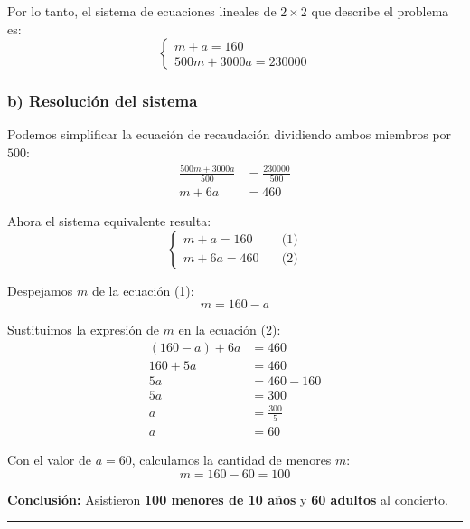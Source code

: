 \documentclass[11pt,a4paper]{article}
\begin{document}
Por lo tanto, el sistema de ecuaciones lineales de $2 \times 2$ que describe el problema es:
\begin{equation*}
\begin{cases}
    m + a = 160 \\
    500m + 3000a = 230000
\end{cases}
\end{equation*}

\subsubsection*{b) Resolución del sistema}

Podemos simplificar la ecuación de recaudación dividiendo ambos miembros por $500$:
\begin{align*}
    \frac{500m + 3000a}{500} &= \frac{230000}{500} \\
    m + 6a &= 460
\end{align*}

Ahora el sistema equivalente resulta:
\begin{equation*}
\begin{cases}
    m + a = 160 \quad &\text{(1)} \\
    m + 6a = 460 \quad &\text{(2)}
\end{cases}
\end{equation*}

Despejamos $m$ de la ecuación (1):
\begin{equation*}
    m = 160 - a
\end{equation*}

Sustituimos la expresión de $m$ en la ecuación (2):
\begin{align*}
    (160 - a) + 6a &= 460 \\
    160 + 5a &= 460 \\
    5a &= 460 - 160 \\
    5a &= 300 \\
    a &= \frac{300}{5} \\
    a &= 60
\end{align*}

Con el valor de $a = 60$, calculamos la cantidad de menores $m$:
\begin{equation*}
    m = 160 - 60 = 100
\end{equation*}

\noindent \textbf{Conclusión:} Asistieron \textbf{100 menores de 10 años} y \textbf{60 adultos} al concierto.

\vspace{0.8cm}
\hrule
\vspace{0.8cm}
\end{document}
